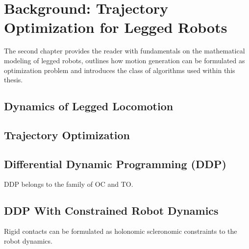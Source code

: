 
\chapter{Background: Trajectory Optimization for Legged Robots}\label{c2}
The second chapter provides the reader with fundamentals on the mathematical modeling of legged robots, outlines how motion generation can be formulated as optimization problem and introduces the class of algorithms used within this thesis. 

\section{Dynamics of Legged Locomotion}
\section{Trajectory Optimization}
\section{Differential Dynamic Programming (DDP)}
DDP belongs to the family of \gls{OC} and \gls{TO}.
\section{DDP With Constrained Robot Dynamics}
Rigid contacts can be formulated as holonomic scleronomic constraints to the robot dynamics. 

